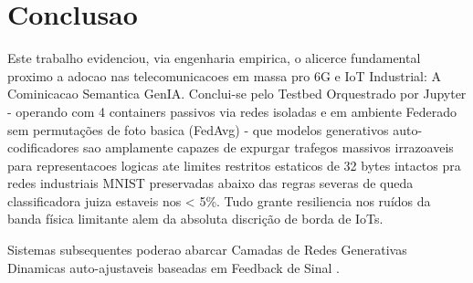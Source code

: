 \documentclass[conference]{IEEEtran}
\begin{document}
\section{Conclusao}

Este trabalho evidenciou, via engenharia empirica, o alicerce fundamental proximo a adocao nas telecomunicacoes em massa pro 6G e IoT Industrial: A Cominicacao Semantica GenIA.
Conclui-se pelo Testbed Orquestrado por Jupyter - operando com 4 containers passivos via redes isoladas e em ambiente Federado sem permutações de foto basica (FedAvg) - que modelos generativos auto-codificadores sao amplamente capazes de expurgar trafegos massivos irrazoaveis para representacoes logicas ate limites restritos estaticos de 32 bytes intactos pra redes industriais MNIST preservadas abaixo das regras severas de queda classificadora juiza estaveis nos < 5\%.
Tudo grante resiliencia nos ruídos da banda física limitante alem da absoluta discrição de borda de IoTs.

Sistemas subsequentes poderao abarcar Camadas de Redes Generativas Dinamicas auto-ajustaveis baseadas em Feedback de Sinal \cite{xia2023gennet_layer}.



\end{document}
